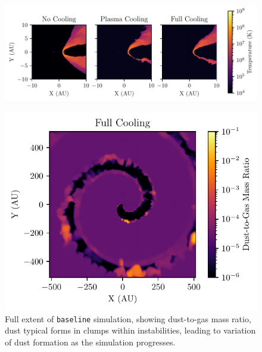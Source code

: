 \begin{figure}
  \centering
  \includegraphics{assets/results/radiative/radiative-crop-2-temp.pdf}
  \caption[]{}
  \label{fig:postshocktemperature}
\end{figure}

\begin{figure}
  \centering
  \includegraphics{assets/results/radiative/z.pdf}
  \caption[\texttt{Baseline} simulation $z$, full extent]{Full extent of \texttt{baseline} simulation, showing dust-to-gas mass ratio, dust typical forms in clumps within instabilities, leading to variation of dust formation as the simulation progresses.}
  \label{fig:full-radiative-z}
\end{figure}




